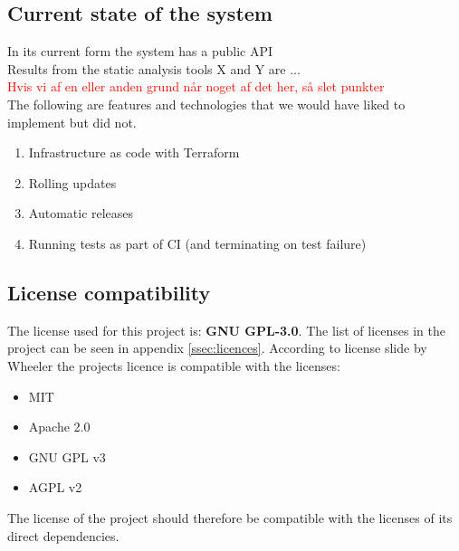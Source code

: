 \subsection{Current state of the system}

In its current form the system has a public API \\ 

Results from the static analysis tools X and Y are ... \\ 


\textcolor{red}{Hvis vi af en eller anden grund når noget af det her, så slet punkter} \\
The following are features and technologies that we would have liked to implement but did not.

\begin{enumerate}
    \item Infrastructure as code with Terraform
    \item Rolling updates 
    \item Automatic releases
    \item Running tests as part of CI (and terminating on test failure)
\end{enumerate}



\subsection{License compatibility}
The license used for this project is: \textbf{GNU GPL-3.0}. The list of licenses in the project can be seen in appendix \ref{ssec:licences}. According to license slide by Wheeler\cite{LicenseComp} the projects licence is compatible with the licenses: 
\begin{itemize}
    \item MIT
    \item Apache 2.0
    \item GNU GPL v3
    \item AGPL v2 
\end{itemize}
The license of the project should therefore be compatible with the licenses of its direct dependencies.